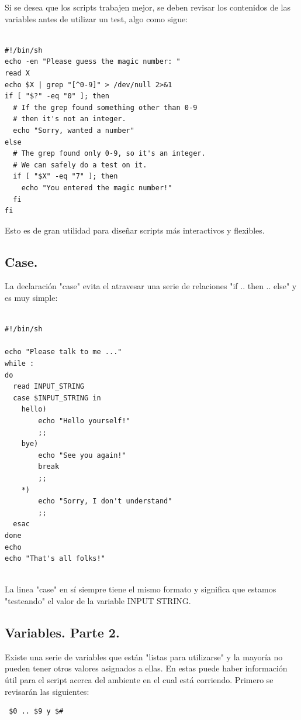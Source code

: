 \documentclass{article} %
\begin{document}
Si se desea que los scripts trabajen  mejor, se deben revisar los contenidos de las variables antes de utilizar un test, algo como sigue:

\begin{verbatim} 

#!/bin/sh
echo -en "Please guess the magic number: "
read X
echo $X | grep "[^0-9]" > /dev/null 2>&1
if [ "$?" -eq "0" ]; then
  # If the grep found something other than 0-9
  # then it's not an integer.
  echo "Sorry, wanted a number"
else
  # The grep found only 0-9, so it's an integer. 
  # We can safely do a test on it.
  if [ "$X" -eq "7" ]; then
    echo "You entered the magic number!"
  fi
fi

\end{verbatim}

Esto es de gran utilidad para diseñar scripts más interactivos y flexibles.

\subsection{Case.}

La declaración "case" evita el atravesar una serie de relaciones "if .. then .. else" y es muy simple:

\begin{verbatim} 

#!/bin/sh

echo "Please talk to me ..."
while :
do
  read INPUT_STRING
  case $INPUT_STRING in
	hello)
		echo "Hello yourself!"
		;;
	bye)
		echo "See you again!"
		break
		;;
	*)
		echo "Sorry, I don't understand"
		;;
  esac
done
echo 
echo "That's all folks!"


\end{verbatim}

La linea "case" en sí siempre tiene el mismo formato y significa que estamos "testeando" el valor de la variable INPUT STRING. 

\subsection{Variables. Parte 2.}

Existe una serie de variables que están "listas para utilizarse" y la mayoría no pueden tener otros valores asignados a ellas. En estas puede haber información útil para el script acerca del ambiente en el cual está corriendo. Primero se revisarán las siguientes:

\begin{verbatim} 
 $0 .. $9 y $#
 \end{verbatim}
\end{document}
